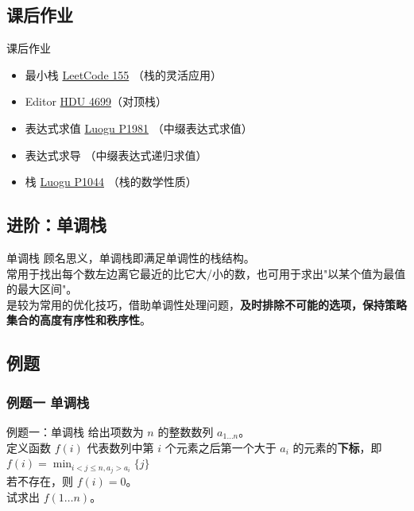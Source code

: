 \documentclass{beamer}
\begin{document}
\subsection{课后作业}
\begin{frame}{课后作业}
    \begin{itemize}
        \item 最小栈 \href{https://leetcode.cn/problems/min-stack/}{LeetCode 155} （栈的灵活应用）
        \item Editor \href{https://acm.hdu.edu.cn/showproblem.php?pid=4699}{HDU 4699}（对顶栈）
        \item {} 表达式求值 \href{https://www.luogu.com.cn/problem/P1981}{Luogu P1981} （中缀表达式求值）
        \item {} 表达式求导 （中缀表达式递归求值）
        \item {} 栈 \href{https://www.luogu.com.cn/problem/P1044}{Luogu P1044} （栈的数学性质）
      \end{itemize}
\end{frame}

\subsection{进阶：单调栈}
\begin{frame}{单调栈}
    顾名思义，单调栈即满足单调性的栈结构。\\

    常用于找出每个数左边离它最近的比它大/小的数，也可用于求出"以某个值为最值的最大区间"。\\

    是较为常用的优化技巧，借助单调性处理问题，\textbf{及时排除不可能的选项，保持策略集合的高度有序性和秩序性}。
\end{frame}

\subsection{例题}
\subsubsection{例题一 单调栈}
\begin{frame}{例题一：单调栈}
    给出项数为 $n$ 的整数数列 $a_{1 \dots n}$。\\

    定义函数 $f(i)$ 代表数列中第 $i$ 个元素之后第一个大于 $a_i$ 的元素的\textbf{下标}，即
    $f(i)=\min_{i<j\leq n, a_j > a_i} \{j\}$\\
    若不存在，则 $f(i)=0$。\\

    试求出 $f(1\dots n)$。
\end{frame}
\end{document}
